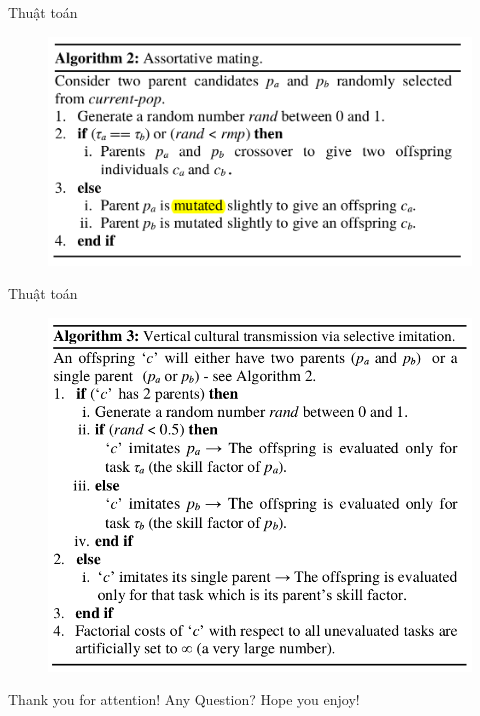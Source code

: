 \documentclass[compress]{beamer}
\begin{document}
\begin{frame}{Thuật toán}
\begin{figure}
\includegraphics[scale=0.45]{al2.png}
\end{figure}
\end{frame}

\begin{frame}{Thuật toán}
\begin{figure}
\includegraphics[scale=0.42]{al3.png}
\end{figure}
\end{frame}

\begin{frame}[plain]{Thank you for attention! Any Question?}
Hope you enjoy!
\end{frame}
\end{document}

